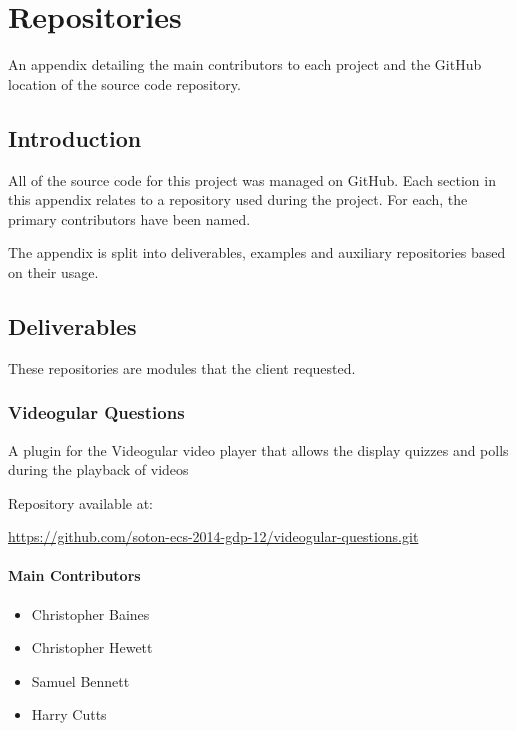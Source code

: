 \chapter{Repositories} \label{App:Repositories}

\begin{preamble}
An appendix detailing the main contributors to each project and the GitHub location of the source code repository.
\end{preamble}

\section{Introduction}

All of the source code for this project was managed on GitHub. Each section in this appendix relates to a repository used during the project. For each, the primary contributors have been named.

The appendix is split into deliverables, examples and auxiliary repositories based on their usage.

\section{Deliverables}

These repositories are modules that the client requested.

\subsection{Videogular Questions}
\label{Section:Repo_videogular_questions}

A plugin for the \gls{Videogular} video player that allows the display quizzes and polls during the playback of videos

Repository available at:

\url{https://github.com/soton-ecs-2014-gdp-12/videogular-questions.git}

\subsubsection{Main Contributors}
\begin{itemize}
  \item Christopher Baines
  \item Christopher Hewett
  \item Samuel Bennett
  \item Harry Cutts
\end{itemize}


